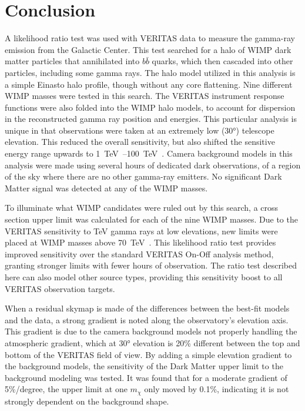 \cleartooddpage[\thispagestyle{empty}]
\chapter{Conclusion}

A likelihood ratio test was used with VERITAS data to measure the gamma-ray emission from the Galactic Center.
This test searched for a halo of WIMP dark matter particles that annihilated into $b\bar{b}$ quarks, which then cascaded into other particles, including some gamma rays.
The halo model utilized in this analysis is a simple Einasto halo profile, though without any core flattening.
Nine different WIMP masses were tested in this search.
The VERITAS instrument response functions were also folded into the WIMP halo models, to account for dispersion in the reconstructed gamma ray position and energies.
This particular analysis is unique in that observations were taken at an extremely low (\nicetilde{}\ang{30}) telescope elevation.
This reduced the overall sensitivity, but also shifted the sensitive energy range upwards to \SIrange{1}{100}{\TeV{}}.
Camera background models in this analysis were made using several hours of dedicated dark observations, of a region of the sky where there are no other gamma-ray emitters.
No significant Dark Matter signal was detected at any of the WIMP masses.

To illuminate what WIMP candidates were ruled out by this search, a cross section upper limit was calculated for each of the nine WIMP masses.
Due to the VERITAS sensitivity to TeV gamma rays at low elevations, new limits were placed at WIMP masses above \SI{70}{\TeV{}}.
This likelihood ratio test provides improved sensitivity over the standard VERITAS On-Off analysis method, granting stronger limits with fewer hours of observation.
The ratio test described here can also model other source types, providing this sensitivity boost to all VERITAS observation targets.

When a residual skymap is made of the differences between the best-fit models and the data, a strong gradient is noted along the observatory's elevation axis.
This gradient is due to the camera background models not properly handling the atmospheric gradient, which at \ang{30} elevation is \nicetilde{}20\% different between the top and bottom of the VERITAS field of view.
By adding a simple elevation gradient to the background models, the sensitivity of the Dark Matter upper limit to the background modeling was tested.
It was found that for a moderate gradient of 5\%/degree, the upper limit at one $m_{\chi}$ only moved by 0.1\%, indicating it is not strongly dependent on the background shape.

